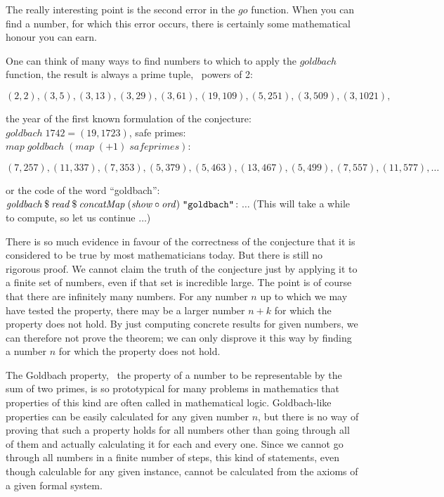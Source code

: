 \documentclass{scrreprt}
\newcommand{\Varid}[1]{\mathit{#1}}
\begin{document}
The really interesting point 
is the second error in the \ensuremath{\Varid{go}} function.
When you can find a number, for which this error occurs,
there is certainly some mathematical honour you can earn.

One can think of many ways to find numbers
to which to apply the \ensuremath{\Varid{goldbach}} function, the result
is always a prime tuple, \eg\ powers of 2:

$(2,2),(3,5),(3,13),(3,29),(3,61),(19,109),(5,251),(3,509),(3,1021),$

the year of the first
known formulation of the conjecture: \ensuremath{\Varid{goldbach}\;\mathrm{1742}\mathrel{=}(\mathrm{19},\mathrm{1723})},
safe primes: \ensuremath{\Varid{map}\;\Varid{goldbach}\;(\Varid{map}\;(\mathbin{+}\mathrm{1})\;\Varid{safeprimes})}:

$(7,257),(11,337),(7,353),(5,379),(5,463),(13,467),(5,499),(7,557),(11,577),\dots$

or the  code of the word ``goldbach'':\\
\ensuremath{\Varid{goldbach}\mathbin{\$}\Varid{read}\mathbin{\$}\Varid{concatMap}\;(\Varid{show}\mathbin{\circ}\Varid{ord})\;\text{\tt \char34 goldbach\char34}}: $\dots$
(This will take a while to compute, so let us continue $\dots$)

There is so much evidence in favour of the correctness
of the conjecture that it is considered to be true 
by most mathematicians today.
But there is still no rigorous proof.
We cannot claim the truth of the conjecture
just by applying it to a finite set of numbers,
even if that set is incredible large.
The point is of course that there are infinitely many numbers.
For any number $n$ up to which we may have tested the property,
there may be a larger number $n+k$ for which the property
does not hold. By just computing concrete results for given numbers,
we can therefore not prove the theorem;
we can only disprove it this way by finding a number $n$
for which the property does not hold.

The Goldbach property, \ie\ the property of a number
to be representable by the sum of two primes,
is so prototypical for many problems in mathematics
that properties of this kind are often called
 in mathematical logic.
Goldbach-like properties can be easily
calculated for any given number $n$, 
but there is no way of proving 
that such a property holds for all numbers other
than going through all of them and actually
calculating it for each and every one. 
Since we cannot go through all numbers
in a finite number of steps, this kind of statements,
even though calculable for any given instance, 
cannot be calculated from the axioms 
of a given formal system.
\end{document}
